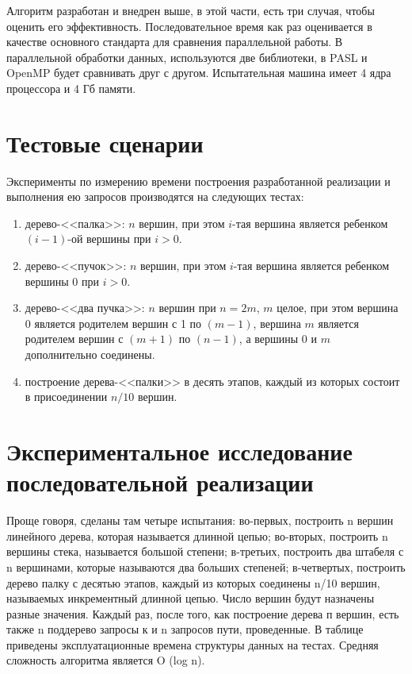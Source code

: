 \documentclass[specification,annotation,times]{itmo-student-thesis}
\newcommand{\revise}[1]{{\color{red!70!black} #1 }}
\begin{document}
\revise{
Алгоритм разработан и внедрен выше, в этой части, есть три случая, чтобы оценить его эффективность. Последовательное время как раз оценивается в качестве основного стандарта для сравнения параллельной 
работы. В параллельной обработки данных, используются две библиотеки, в PASL и OpenMP будет сравнивать друг с другом. Испытательная машина имеет 4 ядра процессора и 4 Гб памяти.
}

\section{Тестовые сценарии}

Эксперименты по измерению времени построения разработанной реализации и выполнения ею запросов производятся на следующих тестах:
\begin{enumerate}
    \item дерево-<<палка>>: $n$ вершин, при этом $i$-тая вершина является ребенком $(i-1)$-ой вершины при $i > 0$.
    \item дерево-<<пучок>>: $n$ вершин, при этом $i$-тая вершина является ребенком вершины 0 при $i > 0$.
    \item дерево-<<два пучка>>: $n$ вершин при $n = 2m$, $m$ целое, при этом вершина 0 является родителем вершин с 1 по $(m-1)$,
          вершина $m$ является родителем вершин с $(m+1)$ по $(n-1)$, а вершины 0 и $m$ дополнительно соединены.
    \item построение дерева-<<палки>> в десять этапов, каждый из которых состоит в присоединении $n / 10$ вершин.
\end{enumerate}

\section{Экспериментальное исследование последовательной реализации}

\revise{
Проще говоря, сделаны там четыре испытания: во-первых, построить n вершин линейного дерева, которая называется длинной цепью; во-вторых, построить n вершины стека, называется большой степени; в-третьих, 
построить два штабеля с n вершинами, которые называются два больших степеней; в-четвертых, построить дерево палку с десятью этапов, каждый из которых соединены n/10 вершин, называемых инкрементный длинной 
цепью. Число вершин будут назначены разные значения. Каждый раз, после того, как построение дерева п вершин, есть также n поддерево запросы к и n запросов пути, проведенные. В таблице приведены 
эксплуатационные времена структуры данных на тестах. Средняя сложность алгоритма является O (log n).
}
\end{document}
